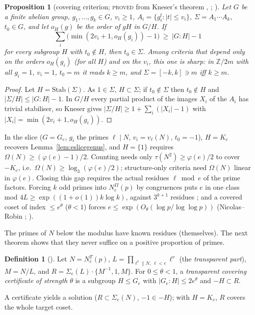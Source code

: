 \documentclass[10pt,reqno]{amsart}
\newtheorem{proposition}[theorem]{Proposition}
\theoremstyle{definition}
\newtheorem{definition}[theorem]{Definition}
\numberwithin{equation}{section}
\newcommand{\Z}{\mathbb Z}
\newcommand{\status}[1]{\textup{\textsc{#1}}}
\begin{document}
\begin{proposition}[covering criterion; \status{proved} from Kneser's theorem \cite{Kn}, {\cite[Thm.~5.5]{TV}}; {\cite[Prop.~1.4]{LP}}]\label{prop:kneser}
Let $G$ be a finite abelian group, $g_1,\dots,g_k\in G$, $v_i\ge1$,
$A_i=\{g_i^t:|t|\le v_i\}$, $\Sigma=A_1\cdots A_k$, $t_0\in G$, and let
$o_H(g)$ be the order of $gH$ in $G/H$. If
\[\textstyle\sum_i\bigl(\min(2v_i+1,o_H(g_i))-1\bigr)\ \ge\ |G:H|-1\]
for every subgroup $H$ with $t_0\notin H$, then $t_0\in\Sigma$. Among
criteria that depend only on the orders $o_H(g_i)$ (for all $H$) and on
the $v_i$, this one is sharp: in $\Z/2m$ with all $g_i=1$, $v_i=1$, $t_0=m$
it reads $k\ge m$, and $\Sigma=[-k,k]\ni m$ iff $k\ge m$.
\end{proposition}
\begin{proof}
Let $H=\mathrm{Stab}(\Sigma)$. As $1\in\Sigma$, $H\subset\Sigma$; if
$t_0\notin\Sigma$ then $t_0\notin H$ and $|\Sigma/H|\le|G:H|-1$. In $G/H$ every
partial product of the images $X_i$ of the $A_i$ has trivial stabiliser, so
Kneser gives $|\Sigma/H|\ge1+\sum_i(|X_i|-1)$ with
$|X_i|=\min(2v_i+1,o_H(g_i))$.
\end{proof}
In the slice ($G=G_e$, $g_i$ the primes $\ell\mid N$, $v_i=v_\ell(N)$,
$t_0=-1$), $H=K_e$ recovers Lemma~\ref{lem:eslicegenus}, and $H=\{1\}$
requires $\Omega(N)\ge(\varphi(e)-1)/2$. Counting needs only
$\tau(N^2)\ge\varphi(e)/2$ to cover $-K_e$, i.e.\ $\Omega(N)\ge\log_3(\varphi(e)/2)$;
structure-only criteria need $\Omega(N)$ linear in $\varphi(e)$. Closing
this gap requires the actual residues $\ell\bmod e$ of the prime factors.
Forcing $k$ odd primes into $N_e^{II}(p)$ by congruences puts $e$ in one
class mod $4L\ge\exp((1+o(1))k\log k)$, against $3^{k+1}$ residues
\cite[Lemma~2.1]{LP}; and a covered coset of index $\le e^\theta$ ($\theta<1$)
forces $e\le\exp(O_\theta(\log p/\log\log p))$ (Nicolas--Robin \cite{NR};
\cite[Lemma~2.3]{LP}).

The primes of $N$ below the modulus have known residues (themselves). The
next theorem shows that they never suffice on a positive proportion of
primes.

\begin{definition}[{\cite[\S2.2]{LP}}]
Let $N=N_e^T(p)$, $L=\prod_{\ell^v\parallel N,\ \ell<e}\ell^v$ (the
\emph{transparent part}), $M=N/L$, and $R=\Sigma_e(L)\cdot\{M^{-1},1,M\}$.
For $0\le\theta<1$, a \emph{transparent covering certificate of strength
$\theta$} is a subgroup $H\le G_e$ with $|G_e:H|\le2e^\theta$ and $-H\subset R$.
\end{definition}
A certificate yields a solution ($R\subset\Sigma_e(N)$, $-1\in-H$); with $H=K_e$,
$R$ covers the whole target coset.
\end{document}
